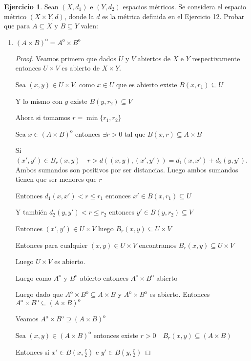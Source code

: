 \documentclass[12pt]{article}
\newcommand{\open}{\mathrm{o}}
\theoremstyle{definition}
\newtheorem{ej}{Ejercicio}
\begin{document}
\newpage
\begin{ej}
  Sean $(X,d_{1})$ e $(Y,d_{2})$ espacios métricos. Se considera el espacio métrico $(X \times Y , d)$, donde la $d$ es la métrica definida en el Ejercicio 12. Probar que para $A \subseteq X$ y $B \subseteq Y$ valen: 
  \begin{enumerate}
    \item $(A\times B)^{\open} = A^{\open} \times B^{\open}$
      \begin{proof}

	Veamos primero que dados $U$ y $V$ abiertos de $X$ e $Y$ respectivamente entonces $U \times V$ es abierto de $X\times Y$.

	Sea $(x,y) \in U \times V$. como $x \in U$ que es abierto existe $B(x,r_{1}) \subseteq U$ 

	Y lo mismo con $y$ existe $B(y,r_{2}) \subseteq V$

	Ahora si tomamos $r = \min{\{r_{1},r_{2}\}}$
	
	Sea $x \in (A \times B)^{\open}$ entonces $\exists r>0$ tal que $B(x,r) \subseteq A \times B$

	Si $(x',y') \in B_{r}(x,y) \quad r > d((x,y),(x',y')) = d_{1}(x,x') + d_{2}(y,y') $. Ambos sumandos son positivos por ser distancias. Luego ambos sumandos tienen que ser menores que $r$

	Entonces $d_{1}(x,x') < r \leq r_{1} $ entonces $x' \in B(x,r_{1}) \subseteq U$

	Y también $d_{2}(y,y') < r \leq r_{2}$ entonces $y' \in B(y,r_{2}) \subseteq V$

	Entonces $(x',y') \in U \times V$ luego $B_{r}(x,y) \subseteq U \times V$

	Entonces para cualquier $(x,y) \in U \times V$ encontramos $B_{r}(x,y) \subseteq U \times V$

	Luego $U \times V$ es abierto.

	Luego como $A^{\open}$ y $B^{\open}$ abierto entonces $A^{\open} \times B^{\open}$ abierto 

	Luego dado que $A^{\open} \times B^{\open} \subseteq A \times B$ y $A^{\open} \times B^{\open}$ es abierto. Entonces $A^{\open} \times B^{\open} \subseteq (A \times B)^{\open}$

	Veamos $A^{\open} \times B^{\open} \supseteq (A \times B)^{\open}$

	Sea $(x,y) \in (A \times B)^{\open}$ entonces existe $r>0 \quad B_{r}(x,y) \subseteq (A \times B)$

	Entonces si $x' \in B(x,\frac{r}{2})$ e $y' \in B(y,\frac{r}{2})$


\end{proof}
\end{enumerate}
\end{ej}
\end{document}
